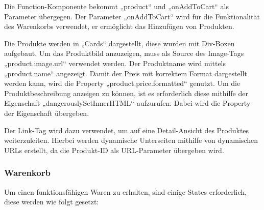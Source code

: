 Die Function-Komponente bekommt „product“ und „onAddToCart“ als Parameter übergegen. Der Parameter „onAddToCart“ wird für die Funktionalität des Warenkorbs verwendet, er ermöglicht das Hinzufügen von Produkten.

Die Produkte werden in „Cards“ dargestellt, diese wurden mit Div-Boxen aufgebaut. Um das Produktbild anzuzeigen, muss als Source des Image-Tags „{product.image.url}“ verwendet werden. Der Produktname wird mittels „{product.name}“ angezeigt.  Damit der Preis mit korrektem Format dargestellt werden kann, wird die Property „{product.price.formatted}“ genutzt. Um die Produktbeschreibung anzeigen zu können, ist es erforderlich diese mithilfe der Eigenschaft „dangerouslySetInnerHTML“ aufzurufen. Dabei wird die Property der Eigenschaft übergeben.

Der Link-Tag wird dazu verwendet, um auf eine Detail-Ansicht des Produktes weiterzuleiten. Hierbei werden dynamische Unterseiten mithilfe von dynamischen URLs erstellt, da die Produkt-ID als URL-Parameter übergeben wird.

\subsubsection{Warenkorb}
Um einen funktionsfähigen Waren zu erhalten, sind einige States erforderlich, diese werden wie folgt gesetzt: \\


